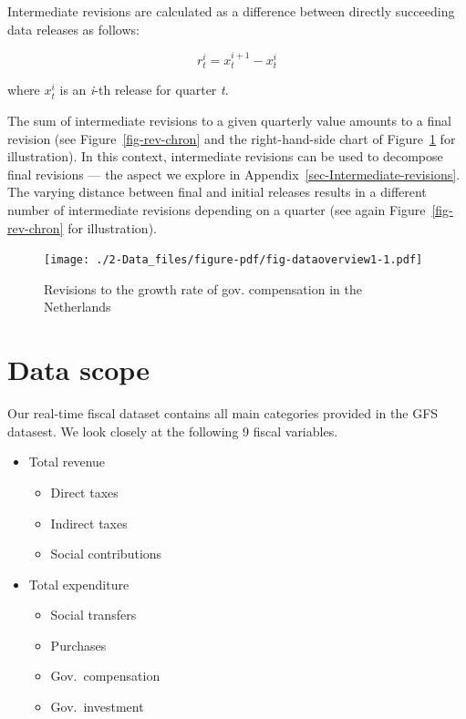 \documentclass[
  letterpaper,
  authoryear,
  preprint,
  3p]{elsarticle}
\providecommand{\tightlist}{%
  \setlength{\itemsep}{0pt}\setlength{\parskip}{0pt}}\usepackage{longtable,booktabs,array}
\begin{document}
Intermediate revisions are calculated as a difference between directly
succeeding data releases as follows:

\[
r_{t}^{i}=x_{t}^{i+1}-x_{t}^{i}
\]

where \(x_{t}^{i}\) is an \emph{i}-th release for quarter \emph{t}.

The sum of intermediate revisions to a given quarterly value amounts to
a final revision (see Figure~\ref{fig-rev-chron} and the right-hand-side
chart of Figure~\ref{fig-dataoverview1} for illustration). In this
context, intermediate revisions can be used to decompose final revisions
--- the aspect we explore in Appendix~\ref{sec-Intermediate-revisions}.
The varying distance between final and initial releases results in a
different number of intermediate revisions depending on a quarter (see
again Figure~\ref{fig-rev-chron} for illustration).

\begin{figure}[H]

{\centering \texttt{[image: ./2-Data\_files/figure-pdf/fig-dataoverview1-1.pdf]}

}

\caption{\label{fig-dataoverview1}Revisions to the growth rate of gov.
compensation in the Netherlands}

\end{figure}

\hypertarget{data-scope}{%
\section{Data scope}\label{data-scope}}

Our real-time fiscal dataset contains all main categories provided in
the GFS datasest. We look closely at the following 9 fiscal variables.

\begin{itemize}
\tightlist
\item
  Total revenue

  \begin{itemize}
  \tightlist
  \item
    Direct taxes
  \item
    Indirect taxes
  \item
    Social contributions
  \end{itemize}
\item
  Total expenditure

  \begin{itemize}
  \tightlist
  \item
    Social transfers
  \item
    Purchases
  \item
    Gov.~compensation
  \item
    Gov.~investment
  \end{itemize}
\end{itemize}
\end{document}
